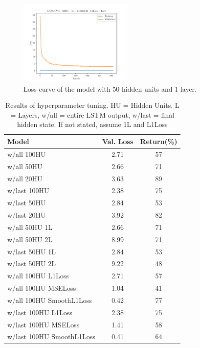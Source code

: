 \begin{figure}[h]
    \centering
    \includegraphics[width=0.5\textwidth, trim=20 0 20 10, clip]{plots/LSTM AO - 50HU - 1L - 0.0001LR - L1Loss-loss.pdf}
    \caption{Loss curve of the model with 50 hidden units and 1 layer.}
    \label{fig:loss_curve}
\end{figure}

\begin{table}[h]
    \centering
    \begin{tabular}{lcc}
        \hline
        \textbf{Model} & \textbf{Val. Loss} & \textbf{Return(\%)} \\ \hline
        w/all 100HU & 2.71 & 57 \\ 
        w/all 50HU & 2.66 & 71 \\ 
        w/all 20HU & 3.63 & 89 \\
        \hline
        w/last 100HU & 2.38 & 75 \\
        w/last 50HU & 2.84 & 53 \\
        w/last 20HU & 3.92 & 82 \\
        \hline
        w/all 50HU 1L & 2.66 & 71 \\ 
        w/all 50HU 2L & 8.99 & 71 \\ 
        \hline
        w/last 50HU 1L & 2.84 & 53 \\
        w/last 50HU 2L & 9.22 & 48 \\ 
        \hline
        w/all 100HU L1Loss & 2.71 & 57 \\ 
        w/all 100HU MSELoss & 1.04 & 41 \\ 
        w/all 100HU SmoothL1Loss & 0.42 & 77 \\ 
        \hline
        w/last 100HU L1Loss & 2.38 & 75 \\ 
        w/last 100HU MSELoss & 1.41 & 58 \\ 
        w/last 100HU SmoothL1Loss & 0.41 & 64 \\ 
    \end{tabular}
    \caption{Results of hyperparameter tuning. HU = Hidden Units, L = Layers, w/all = entire LSTM output, w/last = final hidden state. If not stated, assume 1L and L1Loss}
    \label{tab:results}
\end{table}

